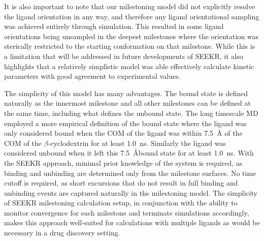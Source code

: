 \par It is also important to note that our milestoning model did not explicitly
resolve the ligand orientation in any way, and therefore any ligand orientational
sampling was achieved entirely through simulation. This resulted in some ligand
orientations being unsampled in the deepest milestones where the orientation was
sterically restricted to the starting conformation on that milestone. While this
is a limitation that will be addressed in future developments of SEEKR, it also
highlights that a relatively simplistic model was able effectively calculate
kinetic parameters with good agreement to experimental values.

\par The simplicity of this model has many advantages. The bound state is
defined naturally as the innermost milestone and all other milestones can be
defined at the same time, including what defines the unbound state. The long
timescale MD employed a more empirical definition of the bound state where the
ligand was only considered bound when the COM of the ligand was within 7.5~\AA
of the COM of the $\beta$-cyclodextrin for at least 1.0~ns. Similarly the ligand
was considered unbound when it left this 7.5~\AA bound state for at least 1.0~ns.
With the SEEKR approach, minimal prior knowledge of the system is required, as
binding and unbinding are determined only from the milestone surfaces. No time
cutoff is required, as short excursions that do not result in full binding and
unbinding events are captured naturally in the milestoning model. The simplicity of SEEKR milestoning calculation setup, in conjunction with
the ability to monitor convergence for each milestone and terminate
simulations accordingly, makes this approach well-suited for
calculations with multiple ligands as would be necessary in a drug
discovery setting.


